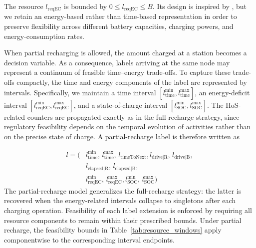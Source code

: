 \documentclass[3p,11pt,authoryear]{elsarticle}  %
\begin{document}

The resource \(l_{\text{reqEC}}\) is bounded by \(0 \leq l_{\text{reqEC}} \leq B\). Its design is inspired by \citet{desaulniers2016exact}, but we retain an energy-based rather than time-based representation in order to preserve flexibility across different battery capacities, charging powers, and energy-consumption rates.

When partial recharging is allowed, the amount charged at a station becomes a decision variable. As a consequence, labels arriving at the same node may represent a continuum of feasible time--energy trade-offs. To capture these trade-offs compactly, the time and energy components of the label are represented by intervals. Specifically, we maintain a time interval \([l_{\text{time}}^{\min},l_{\text{time}}^{\max}]\), an energy-deficit interval \([l_{\text{reqEC}}^{\min},l_{\text{reqEC}}^{\max}]\), and a state-of-charge interval \([l_{\text{SOC}}^{\min},l_{\text{SOC}}^{\max}]\). The HoS-related counters are propagated exactly as in the full-recharge strategy, since regulatory feasibility depends on the temporal evolution of activities rather than on the precise state of charge. A partial-recharge label is therefore written as


\[
\begin{aligned}
l = (&l_{\text{time}}^{\min},\, l_{\text{time}}^{\max},\, l_{\text{timeToNext}}, l_{\text{drive|R}},\, l_{\text{drive|B}},\\
     &l_{\text{elapsed|R}},\, l_{\text{elapsed|B}}, \\ 
     &l_{\text{reqEC}}^{\min},\, l_{\text{reqEC}}^{\max},
     l_{\text{SOC}}^{\min},\, l_{\text{SOC}}^{\max})
\end{aligned}
\]
The partial-recharge model generalizes the full-recharge strategy: the latter is recovered when the energy-related intervals collapse to singletons after each charging operation. Feasibility of each label extension is enforced by requiring all resource components to remain within their prescribed bounds. Under partial recharge, the feasibility bounds in Table~\ref{tab:resource_windows} apply componentwise to the corresponding interval endpoints.
\end{document}
